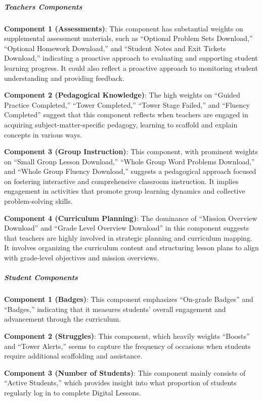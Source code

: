 \documentclass[
  number,
  preprint,
  3p,
  onecolumn]{elsarticle}
\let\oldsubparagraph\subparagraph
\renewcommand{\subparagraph}[1]{\oldsubparagraph{#1}\mbox{}}
\begin{document}
\subparagraph{Teachers Components}\label{teachers-components}

\textbf{Component 1 (Assessments)}: This component has substantial
weights on supplemental assessment materials, such as ``Optional Problem
Sets Download,'' ``Optional Homework Download,'' and ``Student Notes and
Exit Tickets Download,'' indicating a proactive approach to evaluating
and supporting student learning progress. It could also reflect a
proactive approach to monitoring student understanding and providing
feedback.

\textbf{Component 2 (Pedagogical Knowledge)}: The high weights on
``Guided Practice Completed,'' ``Tower Completed,'' ``Tower Stage
Failed,'' and ``Fluency Completed'' suggest that this component reflects
when teachers are engaged in acquiring subject-matter-specific pedagogy,
learning to scaffold and explain concepts in various ways.

\textbf{Component 3 (Group Instruction)}: This component, with prominent
weights on ``Small Group Lesson Download,'' ``Whole Group Word Problems
Download,'' and ``Whole Group Fluency Download,'' suggests a pedagogical
approach focused on fostering interactive and comprehensive classroom
instruction. It implies engagement in activities that promote group
learning dynamics and collective problem-solving skills.

\textbf{Component 4 (Curriculum Planning)}: The dominance of ``Mission
Overview Download'' and ``Grade Level Overview Download'' in this
component suggests that teachers are highly involved in strategic
planning and curriculum mapping. It involves organizing the curriculum
content and structuring lesson plans to align with grade-level
objectives and mission overviews.

\subparagraph{Student Components}\label{student-components}

\textbf{Component 1 (Badges)}: This component emphasizes ``On-grade
Badges'' and ``Badges,'' indicating that it measures students' overall
engagement and advancement through the curriculum.

\textbf{Component 2 (Struggles)}: This component, which heavily weights
``Boosts'' and ``Tower Alerts,'' seems to capture the frequency of
occasions when students require additional scaffolding and assistance.

\textbf{Component 3 (Number of Students)}: This component mainly
consists of ``Active Students,'' which provides insight into what
proportion of students regularly log in to complete Digital Lessons.
\end{document}
